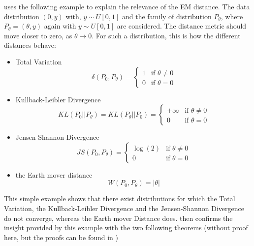 \documentclass[11pt,a4paper,twoside]{report}
\begin{document}
\cite{arjovsky2017wasserstein} uses the following example to explain the relevance of the EM distance. The data distribution $(0, y)$ with, $y \sim U[0,1]$ and the family of distribution $P_{\theta}$, where $P_{\theta} = (\theta, y)$ again with $y \sim U[0,1]$ are considered. The distance metric should move closer to zero, as $\theta \rightarrow 0$. For such a distribution, this is how the different distances behave:

\begin{itemize}
    \item Total Variation
    \begin{equation}
        \delta(P_0, P_{\theta}) = 
        \begin{cases}
            1 & \text{if } \theta \neq 0\\
            0 & \text{if } \theta = 0
        \end{cases}
    \end{equation}
    \item Kullback-Leibler Divergence
    \begin{equation}
        KL(P_0 || P_{\theta}) = KL(P_{\theta} || P_0) =
        \begin{cases}
            +\infty & \text{if } \theta \neq 0\\
            0 & \text{if } \theta = 0
        \end{cases}
    \end{equation}
    \item Jensen-Shannon Divergence  
    \begin{equation}
        JS(P_0, P_{\theta}) = 
        \begin{cases}
            \log(2) & \text{if } \theta \neq 0\\
            0 & \text{if } \theta = 0
        \end{cases}
    \end{equation}
    \item the Earth mover distance
    \begin{equation}
        W(P_0, P_{\theta}) = |\theta|
    \end{equation}
\end{itemize}

This simple example shows that there exist distributions for which the Total Variation, the Kullback-Leibler Divergence and the Jensen-Shannon Divergence do not converge, whereas the Earth mover Distance does. \cite{arjovsky2017wasserstein} then confirms the insight provided by this example with the two following theorems (without proof here, but the proofs can be found in \cite{arjovsky2017wasserstein})
\end{document}
